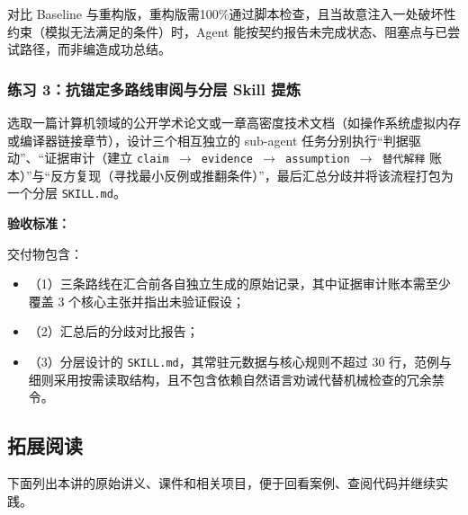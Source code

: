 \documentclass[UTF8,a4paper,11pt,fontset=fandol]{ctexart}
\begin{document}
对比 Baseline 与重构版，重构版需100\%通过脚本检查，且当故意注入一处破坏性约束（模拟无法满足的条件）时，Agent 能按契约报告未完成状态、阻塞点与已尝试路径，而非编造成功总结。

\subsubsection*{练习 3：抗锚定多路线审阅与分层 Skill 提炼}

选取一篇计算机领域的公开学术论文或一章高密度技术文档（如操作系统虚拟内存或编译器链接章节），设计三个相互独立的 sub-agent 任务分别执行“判据驱动”、“证据审计（建立 \texttt{claim \ensuremath{\rightarrow} evidence \ensuremath{\rightarrow} assumption \ensuremath{\rightarrow} 替代解释} 账本）”与“反方复现（寻找最小反例或推翻条件）”，最后汇总分歧并将该流程打包为一个分层 \texttt{SKILL.md}。

\par{}\textbf{验收标准：}

交付物包含：

\begin{itemize}
\item （1）三条路线在汇合前各自独立生成的原始记录，其中证据审计账本需至少覆盖 3 个核心主张并指出未验证假设；

\item （2）汇总后的分歧对比报告；

\item （3）分层设计的 \texttt{SKILL.md}，其常驻元数据与核心规则不超过 30 行，范例与细则采用按需读取结构，且不包含依赖自然语言劝诫代替机械检查的冗余禁令。
\end{itemize}

\subsection{拓展阅读}

下面列出本讲的原始讲义、课件和相关项目，便于回看案例、查阅代码并继续实践。
\end{document}
